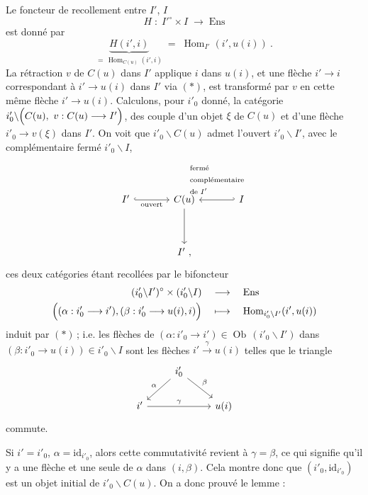 \documentclass[11pt]{article}
\newcommand{\printedpage}[1]{\marginpar{\footnotesize p.~#1}}
\newcommand{\msp}[1]{\marginpar{\footnotesize [#1]}}
\newcommand{\Ob}{\operatorname{Ob}}
\newcommand{\Hom}{\operatorname{Hom}}
\newcommand{\id}{\mathrm{id}}
\begin{document}
\msp{page 61}
Le foncteur de recollement entre $I'$, $I$
\[
H \;:\; I'^\circ\times I \;\longrightarrow\; \mathrm{Ens}
\]
est donné par
\[
\underbrace{H(i',i)}_{=\,\Hom_{C(u)}(i',i)} \;=\; \Hom_{I'}(i',u(i))\ . \tag*{$(*)$}
\]
La rétraction $v$ de $C(u)$ dans $I'$ applique $i$ dans $u(i)$, et une flèche $i'\longrightarrow i$ correspondant à $i'\longrightarrow u(i)$ dans $I'$ via $(*)$, est transformé par $v$ en cette même flèche $i'\longrightarrow u(i)$. Calculons, %
pour $i'_0$ donné, la catégorie $i'_0\backslash\Bigl(C(u),\ v : C(u)\longrightarrow I'\Bigr)$, des couple d'un objet $\xi$ de $C(u)$ %
et d'une flèche $i'_0\longrightarrow v(\xi)$ dans $I'$. On voit que $i'_0\backslash C(u)$ admet l'ouvert $i'_0\backslash I'$, avec le complémentaire fermé $i'_0\backslash I$,
\[
\begin{tikzcd}[column sep=large, row sep=huge]
I' \arrow[r, hook, "\text{ouvert}"'] & C(u) \arrow[d] & I \arrow[l, hook', "\begin{array}{l}\text{fermé}\\ \text{complémentaire}\\ \text{de } I'\end{array}"'] \\
 & I'\ ,
\end{tikzcd}
\]
ces deux catégories étant recollées par le bifoncteur
\[
\begin{aligned}
(i'_0\backslash I')^\circ \times (i'_0\backslash I) &\quad\longrightarrow\quad \mathrm{Ens}\\
\Bigl((\alpha : i'_0\longrightarrow i'), (\beta : i'_0\longrightarrow u(i), i)\Bigr) &\quad\longmapsto\quad \Hom_{i'_0\backslash I'}(i',u(i))
\end{aligned}
\]
\printedpage{31}
induit par $(*)$\,; i.e. les flèches de $(\alpha : i'_0\longrightarrow i') \in \Ob\,(i'_0\backslash I')$ dans $(\beta : i'_0\longrightarrow u(i)) \in i'_0\backslash I$ sont les flèches $i' \xrightarrow{\gamma} u(i)$ telles que le triangle
\[
\begin{tikzcd}
 & i'_0 \arrow[dl, "\alpha"'] \arrow[dr, "\beta"] & \\
i' \arrow[rr, "\gamma"] & & u(i)
\end{tikzcd}
\]
commute.

\msp{page 62}
Si $i' = i'_0$, $\alpha = \id_{i'_0}$, alors cette commutativité revient à $\gamma = \beta$, ce qui signifie qu'il y a une flèche et une seule de $\alpha$ dans $(i,\beta)$. Cela montre donc que $(i'_0,\id_{i'_0})$ est un objet initial de $i'_0\backslash C(u)$. On a donc prouvé le lemme :
\end{document}

